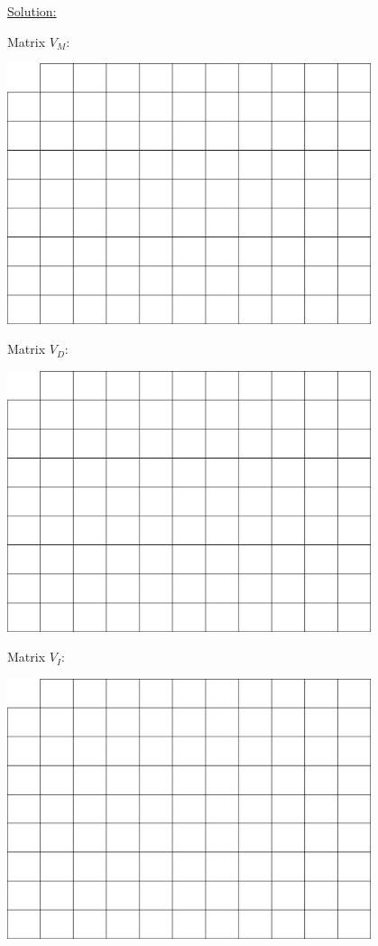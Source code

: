 \documentclass[a4paper,11pt]{article}
\begin{document}
\underline{Solution:}
\newpage

Matrix $V_M$:
\begin{center}
\includegraphics[width=0.8\textwidth]{matrix.png}
\end{center}
\vspace{1.5cm}

Matrix $V_D$:
\begin{center}
\includegraphics[width=0.8\textwidth]{matrix.png}
\end{center}
\vspace{1.5cm}

\newpage 

Matrix $V_I$: 
\begin{center}
\includegraphics[width=0.8\textwidth]{matrix.png}
\end{center}
\vspace{0.5cm}
\end{document}
